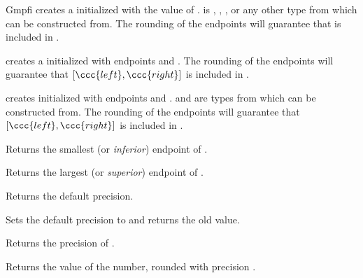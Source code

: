 \begin{ccRefClass} {Gmpfi}
        {creates a  initialized with the value of .
         is , , , or any
        other type from which  can be constructed from. The
        rounding of the endpoints will guarantee that  is included
        in \ccVar .}

        {creates a  initialized with endpoints 
        and . The rounding of the endpoints will guarantee
        that \([\ccc{left},\ccc{right}]\) is included in \ccVar .}

        {creates  initialized with endpoints
         and .   and
         are types from which  can be constructed
        from. The rounding of the endpoints will guarantee that
        \([\ccc{left},\ccc{right}]\) is included in \ccVar .}

\ccOperations

        {Returns the smallest (or \emph{inferior})  endpoint of
        .}

        {Returns the largest (or \emph{superior})  endpoint of
        .}


        {Returns the default precision.}

        {Sets the default precision to  and returns the
        old value.}

        {Returns the precision of \ccVar.}

        {Returns the value of the number, rounded with precision .}




\end{ccRefClass}
